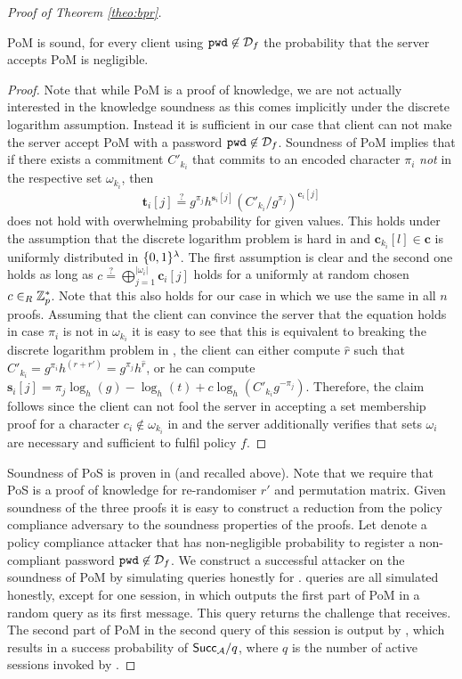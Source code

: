 \begin{proof}[Proof of Theorem \ref{theo:bpr}]
\begin{claim}
  \ac{PoM} is sound, \ie for every client \Client using $\mathtt{pwd}\not\in\mathcal{D}_f$ the probability that the server accepts \ac{PoM} is negligible.
\end{claim}

\begin{proof}
Note that while \ac{PoM} is a proof of knowledge, we are not actually interested in the knowledge soundness as this comes implicitly under the discrete logarithm assumption.
Instead it is sufficient in our case that client \Client can not make the server accept \ac{PoM} with a password $\mathtt{pwd}\not\in\mathcal{D}_f$.
Soundness of \ac{PoM} implies that if there exists a commitment $C'_{k_i}$ that commits to an encoded character $\pi_i$ \emph{not} in the respective set $\omega_{k_i}$, then
\[ \bm t_i[j] \stackrel{?}{=} g^{\pi_j}h^{\bm s_i[j]}(C'_{k_i}/g^{\pi_j})^{\bm c_i[j]} \]
does not hold with overwhelming probability for given values.
This holds under the assumption that the discrete logarithm problem is hard in \GG and $\bm c_{k_i}[l] \in \bm c$ is uniformly distributed in $\{0,1\}^\lambda$.
The first assumption is clear and the second one holds as long as $c\stackrel{?}{=}\bigoplus_{j=1}^{|\omega_i|}\bm c_i[j]$ holds for a uniformly at random chosen $c\in_R\mathbb{Z}^\ast_p$.
Note that this also holds for our case in which we use the same \Client in all $n$ proofs.
Assuming that the client can convince the server that the equation holds in case $\pi_i$ is not in $\omega_{k_i}$ it is easy to see that this is equivalent to breaking the discrete logarithm problem in \GG, \ie the client can either compute $\hat{r}$ such that $C'_{k_i}=g^{\pi_i}h^{(r+r')}=g^{\pi_j}h^{\hat{r}}$, or he can compute $\bm s_i[j]=\pi_j \log_h(g) - \log_h(t) + c\log_h(C'_{k_i}g^{-\pi_j})$.
Therefore, the claim follows since the client can not fool the server in accepting a set membership proof for a character $c_i\not\in\omega_{k_i}$ in \pwd and the server additionally verifies that sets $\omega_i$ are necessary and sufficient to fulfil policy $f$.

\end{proof}

\noindent
Soundness of \ac{PoS} is proven in \cite{FurukawaS01,Furukawa05} (and recalled above).
Note that we require that \ac{PoS} is a proof of knowledge for re-randomiser $r'$ and permutation matrix.
Given soundness of the three proofs it is easy to construct a reduction from the policy compliance adversary to the soundness properties of the proofs.
Let \cA denote a policy compliance attacker that has non-negligible probability to register a non-compliant password  $\mathtt{pwd}\not\in\mathcal{D}_f$.
We construct a successful attacker \cB on the soundness of \ac{PoM} by simulating \Execute queries honestly for \cA.
\Send queries are all simulated honestly, except for one session, in which \cB outputs the first part of \ac{PoM} in a random \Send query as its first message.
This \Send query returns the challenge that \cB receives.
The second part of \ac{PoM} in the second \Send query of this session is output by \cB, which results in a success probability of $\mathsf{Succ}_{\mathcal{A}}/q$, where $q$ is the number of active sessions invoked by \cA.


\end{proof}
